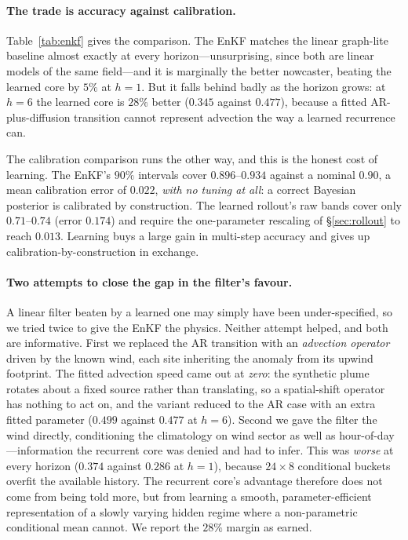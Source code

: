 \documentclass[10pt]{article}
\begin{document}
\paragraph{The trade is accuracy against calibration.}
Table~\ref{tab:enkf} gives the comparison. The EnKF matches the linear graph-lite
baseline almost exactly at every horizon---unsurprising, since both are linear
models of the same field---and it is marginally the better nowcaster, beating the
learned core by $5\%$ at $h=1$. But it falls behind badly as the horizon grows: at
$h=6$ the learned core is $28\%$ better ($0.345$ against $0.477$), because a
fitted AR-plus-diffusion transition cannot represent advection the way a learned
recurrence can.

The calibration comparison runs the other way, and this is the honest cost of
learning. The EnKF's $90\%$ intervals cover $0.896$--$0.934$ against a nominal
$0.90$, a mean calibration error of $0.022$, \emph{with no tuning at all}: a
correct Bayesian posterior is calibrated by construction. The learned rollout's raw
bands cover only $0.71$--$0.74$ (error $0.174$) and require the one-parameter
rescaling of \S\ref{sec:rollout} to reach $0.013$. Learning buys a large gain in
multi-step accuracy and gives up calibration-by-construction in exchange.

\paragraph{Two attempts to close the gap in the filter's favour.}
A linear filter beaten by a learned one may simply have been under-specified, so
we tried twice to give the EnKF the physics. Neither attempt helped, and both are
informative. First we replaced the AR transition with an \emph{advection operator}
driven by the known wind, each site inheriting the anomaly from its upwind
footprint. The fitted advection speed came out at \emph{zero}: the synthetic
plume rotates about a fixed source rather than translating, so a spatial-shift
operator has nothing to act on, and the variant reduced to the AR case with an
extra fitted parameter ($0.499$ against $0.477$ at $h=6$). Second we gave the
filter the wind directly, conditioning the climatology on wind sector as well as
hour-of-day---information the recurrent core was denied and had to infer. This was
\emph{worse} at every horizon ($0.374$ against $0.286$ at $h=1$), because
$24\times8$ conditional buckets overfit the available history. The recurrent core's
advantage therefore does not come from being told more, but from learning a
smooth, parameter-efficient representation of a slowly varying hidden regime where
a non-parametric conditional mean cannot. We report the $28\%$ margin as earned.
\end{document}
